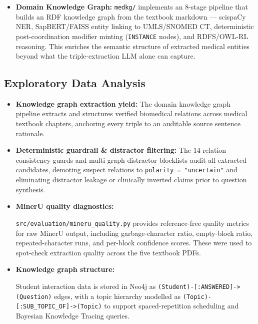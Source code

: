 \begin{itemize}
    \item \textbf{Domain Knowledge Graph:}
          \texttt{medkg/} implements an 8-stage pipeline that builds an RDF knowledge
          graph from the textbook markdown — scispaCy NER, SapBERT/FAISS entity linking to
          UMLS/SNOMED CT, deterministic post-coordination modifier minting (\texttt{INSTANCE}
          nodes), and RDFS/OWL-RL reasoning. This enriches the semantic structure of extracted
          medical entities beyond what the triple-extraction LLM alone can capture.
\end{itemize}


\subsection*{Exploratory Data Analysis}

\begin{itemize}
    \item \textbf{Knowledge graph extraction yield:}
          The domain knowledge graph pipeline extracts and structures verified biomedical relations across medical textbook chapters, anchoring every triple to an auditable source sentence rationale.

    \item \textbf{Deterministic guardrail \& distractor filtering:}
          The 14 relation consistency guards and multi-graph distractor blocklists audit all extracted candidates, demoting suspect relations to \texttt{polarity = "uncertain"} and eliminating distractor leakage or clinically inverted claims prior to question synthesis.

    \item \textbf{MinerU quality diagnostics:}

          {\sloppy \texttt{src/evaluation/mineru\_quality.py} provides reference-free quality metrics for
          raw MinerU output, including garbage-character ratio, empty-block ratio, repeated-character
          runs, and per-block confidence scores. These were used to spot-check extraction quality
          across the five textbook PDFs. \par}

    \item \textbf{Knowledge graph structure:}
          {\sloppy Student interaction data is stored in Neo4j as
          \texttt{(Student)-[:ANSWERED]->(Question)} edges, with a topic hierarchy modelled as
          \texttt{(Topic)-[:SUB\_TOPIC\_OF]->(Topic)} to support spaced-repetition scheduling
          and Bayesian Knowledge Tracing queries.\par}
\end{itemize}

